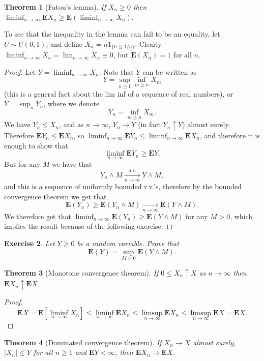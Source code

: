 \documentclass[12pt]{article}
\newtheorem{thm}{Theorem}[section]
\newtheorem{exercise}[thm]{Exercise}
\newcommand{\expec}{\mathbf{E}}
\theoremstyle{example}
\begin{document}
\begin{thm}[Fatou's lemma] If $X_n \ge 0$ then $\liminf_{n\to\infty} \expec X_n \ge \expec(\liminf_{n\to\infty} X_n).$
\end{thm}

To see that the inequality in the lemma can fail to be an equality, let $U \sim U(0,1)$, and define $X_n = n 1_{\{U\le 1/n\}}$. Clearly $\liminf_{n\to\infty}X_n=\lim_{n\to\infty} X_n \equiv 0$, but $\expec(X_n) = 1$ for all $n$.

\begin{proof} Let $Y = \liminf_{n\to\infty} X_n$. Note that $Y$ can be written as
$$ Y = \sup_{n\ge 1} \inf_{m\ge n} X_m $$
(this is a general fact about the lim inf of a sequence of real numbers), or $Y = \sup_n Y_n$, where we denote
$$ Y_n = \inf_{m\ge n} X_m. $$
We have $Y_n \le X_n$, and as $n\to\infty$, $Y_n \to Y$ (in fact $Y_n \uparrow Y$) almost surely. Therefore $\expec Y_n \le \expec X_n$, so $\liminf_{n\to\infty} \expec Y_n \le \liminf_{n\to\infty} \expec X_n$, and therefore
it is enough to show that
$$ \liminf_{n\to\infty} \expec Y_n \ge \expec Y. $$
 But for any $M$ we have that
 $$ Y_n \wedge M \xrightarrow[n\to\infty]{\textrm{a.s.}} Y \wedge M, $$
 and this is a sequence of uniformly bounded r.v.'s, therefore by the bounded convergence theorem we get that
 $$ \expec(Y_n) \ge \expec(Y_n \wedge M) \xrightarrow[n\to\infty]{} \expec(Y\wedge M). $$
We therefore get that $\liminf_{n\to\infty} \expec(Y_n)\ge \expec(Y\wedge M)$ for any $M>0$, which implies the result because of the following exercise.
\end{proof}

\begin{exercise} Let $Y\ge 0$ be a random variable. Prove that $$ \expec(Y) = \sup_{M>0} \expec(Y\wedge M).$$
\end{exercise}

\begin{thm}[Monotone convergence theorem]
If $0\le X_n \uparrow X$ as $n\to\infty$ then $\expec X_n \uparrow \expec X$.
\end{thm}

\begin{proof}
$$ \expec X = \expec [\liminf_{n\to\infty} X_n] \le \liminf_{n\to\infty} \expec X_n \le \limsup_{n\to\infty}
 \expec X_n \le \limsup_{n\to\infty}  \expec X = \expec X. $$
\end{proof} 

\begin{thm}[Dominated convergence theorem]
If $X_n\to X$ almost surely, $|X_n|\le Y$ for all $n\ge 1$ and $\expec Y<\infty$, then $\expec X_n\to \expec X$.
\end{thm}
\end{document}
